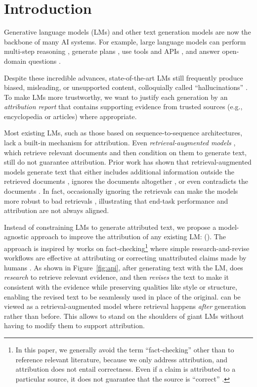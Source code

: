 
\section{Introduction} \label{sec:intro}
Generative language models (LMs) and other text generation models are now the backbone of many AI systems. For example, large language models can perform multi-step reasoning \cite{nye2021show, Wei2022COT}, generate plans \cite{Ahn2022SayCan}, use tools and APIs \cite{shin2021constrained,Thoppilan2022LaMDA}, and answer open-domain questions \cite{petroni2019language,roberts2020much}.

Despite these incredible advances, state-of-the-art LMs still frequently produce biased, misleading, or unsupported content, colloquially called ``hallucinations'' \cite{maynez2020faithfulness,menick2022teaching}. To make LMs more trustworthy, we want to justify each generation by an \emph{attribution report} \cite{Rashkin2021AIS,Bohnet2022AttributedQA} that contains supporting evidence from trusted sources (e.g., encyclopedia or articles) where appropriate.

Most existing LMs, such as those based on sequence-to-sequence architectures, lack a built-in mechanism for attribution. Even \emph{retrieval-augmented models} \cite{gu2020realm,lewis2020rag}, which retrieve relevant documents and then condition on them to generate text, still do not guarantee attribution.
Prior work has shown that retrieval-augmented models generate text that either includes additional information outside the retrieved documents \cite{dziri2022origin}, ignores the documents altogether \cite{krishna2021hurdles}, or even contradicts the documents \cite{longpre2021entity}. In fact, occasionally ignoring the retrievals can make the models more robust to bad retrievals \cite{khandelwal2019generalization}, illustrating that end-task performance and attribution are not always aligned.

Instead of constraining LMs to generate attributed text, we propose a model-agnostic approach to improve the attribution of any existing LM: \emph{\approachfull{}} (\approach{}).
The approach is inspired by works on fact-checking\footnote{In this paper, we generally avoid the term ``fact-checking'' other than to reference relevant literature, because we only address attribution, and attribution does not entail correctness. Even if a claim is attributed to a particular source, it does not guarantee that the source is ``correct'' \cite{menick2022teaching}.} where simple research-and-revise workflows are effective at attributing or correcting unattributed claims made by humans \cite{thorne2018fever,schuster2021get,thorne2021evidence}.
As shown in Figure~\ref{fig:api}, after generating text with the LM, \approach{} does \emph{research} to retrieve relevant evidence, and then \emph{revises} the text to make it consistent with the evidence while preserving qualities like style or structure, enabling the revised text to be seamlessly used in place of the original. \approach{} can be viewed as a retrieval-augmented model where retrieval happens \emph{after} generation rather than before. This allows \approach{} to stand on the shoulders of giant LMs without having to modify them to support attribution.

